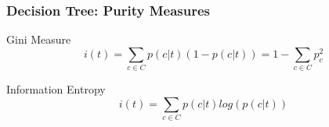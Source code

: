 \begin{frame}
	\frametitle{Decision Tree: Purity Measures}
	\begin{block}{Gini Measure}
		\begin{equation}    
			i(t) = \sum_{c \in C} p(c|t) (1 - p(c|t)) = 1 - \sum_{c \in C} p_{c}^{2}
		\end{equation}
	\end{block}
	\begin{block}{Information Entropy}
		\begin{equation}    
			i(t) = \sum_{c \in C} p(c|t) log(p(c|t))
		\end{equation}
	\end{block}	
\end{frame}